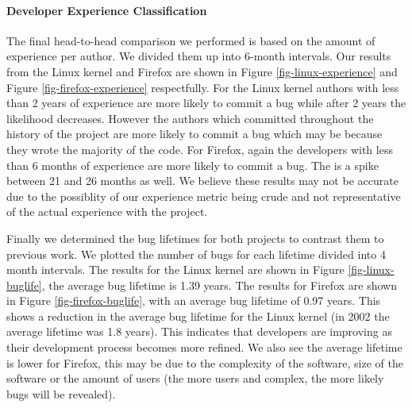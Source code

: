 \paragraph{Developer Experience Classification}
The final head-to-head comparison we performed is based on the amount
of experience per author. We divided them up into 6-month intervals. 
Our results from the Linux kernel and Firefox are shown in Figure
\ref{fig-linux-experience} and Figure \ref{fig-firefox-experience}
respectfully. For the Linux kernel authors with less than 2 years of experience
are more likely to commit a bug while after 2 years the likelihood
decreases. However the authors which committed throughout the history
of the project are more likely to commit a bug which may be because
they wrote the majority of the code. For Firefox, again the
developers with less than 6 months of experience are more likely to
commit a bug. The is a spike between 21 and 26 months as well. We
believe these results may not be accurate due to the possiblity of
our experience metric being crude and not representative of the 
actual experience with the project.



Finally we determined the bug lifetimes for both projects to contrast
them to previous work. We plotted the number of bugs for each lifetime
divided into 4 month intervals. The results for the Linux kernel are shown in
Figure \ref{fig-linux-buglife}, the average bug lifetime is 1.39
years. The results for Firefox are shown in Figure
\ref{fig-firefox-buglife}, with an average bug lifetime of 0.97
years. This shows a reduction in the average bug lifetime for the Linux kernel (in
2002 the average lifetime was 1.8 years). This indicates that
developers are improving as their development process becomes more
refined. We also see the average lifetime is lower for Firefox, this
may be due to the complexity of the software, size of the software or
the amount of users (the more users and complex, the more likely bugs will be
revealed).

